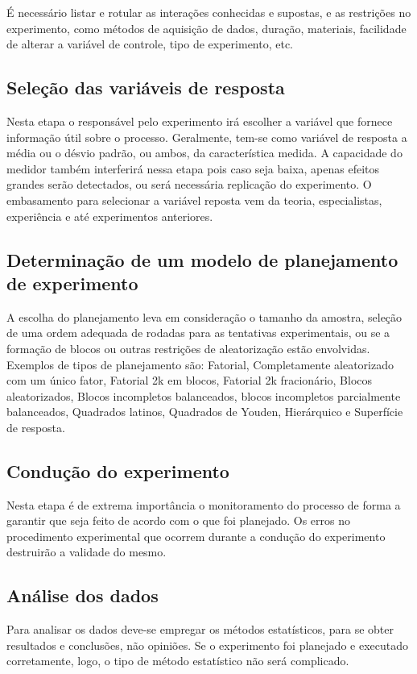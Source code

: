 É necessário listar e rotular as interações conhecidas e supostas, e as restrições no experimento, como métodos de aquisição de dados, duração, materiais, facilidade de alterar a variável de controle, tipo de experimento, etc.


\subsection{Seleção das variáveis de resposta}
Nesta etapa o responsável pelo experimento irá escolher a variável que fornece informação útil sobre o processo. Geralmente, tem-se como variável de resposta a média ou o désvio padrão, ou ambos, da característica medida.
A capacidade do medidor também interferirá nessa etapa pois caso seja baixa, apenas efeitos grandes serão detectados, ou será necessária replicação do experimento. O embasamento para selecionar a variável reposta vem da teoria, especialistas, experiência e até experimentos anteriores.

\subsection{Determinação de um modelo de planejamento de experimento}
A escolha do planejamento leva em consideração o tamanho da amostra, seleção de uma ordem adequada de rodadas para as tentativas experimentais, ou se a formação de blocos ou outras restrições de aleatorização estão envolvidas. Exemplos de tipos de planejamento são: Fatorial, Completamente aleatorizado com um único fator, Fatorial 2k em blocos, Fatorial 2k fracionário, Blocos aleatorizados, Blocos incompletos balanceados, blocos incompletos parcialmente balanceados, Quadrados latinos, Quadrados de Youden, Hierárquico e Superfície de resposta.


\subsection{Condução do experimento}
Nesta etapa é de extrema importância o monitoramento do processo de forma a garantir que seja feito de acordo com o que foi planejado. Os erros no procedimento experimental que ocorrem durante a condução do experimento destruirão a validade do mesmo. 

\subsection{Análise dos dados}
Para analisar os dados deve-se empregar os métodos estatísticos, para se obter resultados e conclusões, não opiniões. Se o experimento foi planejado e executado corretamente, logo, o tipo de método estatístico não será complicado. 

